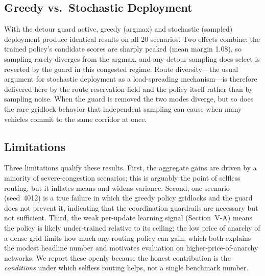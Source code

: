 \subsection{Greedy vs.\ Stochastic Deployment}
With the detour guard active, greedy (argmax) and stochastic (sampled) deployment produce
identical results on all 20 scenarios. Two effects combine: the trained policy's candidate
scores are sharply peaked (mean margin 1.08), so sampling rarely diverges from the argmax,
and any detour sampling does select is reverted by the guard in this congested regime.
Route diversity---the usual argument for stochastic deployment as a load-spreading
mechanism---is therefore delivered here by the route reservation field and the policy
itself rather than by sampling noise. When the guard is removed the two modes diverge, but
so does the rare gridlock behavior that independent sampling can cause when many vehicles
commit to the same corridor at once.

\subsection{Limitations}
Three limitations qualify these results. First, the aggregate gains are driven by a
minority of severe-congestion scenarios; this is arguably the point of selfless routing,
but it inflates means and widens variance. Second, one scenario (seed~4012) is a true
failure in which the greedy policy gridlocks and the guard does not prevent it, indicating
that the coordination guardrails are necessary but not sufficient. Third, the weak
per-update learning signal (Section~V-A) means the policy is likely under-trained relative
to its ceiling; the low price of anarchy of a dense grid limits how much any routing policy
can gain, which both explains the modest headline number and motivates evaluation on
higher-price-of-anarchy networks. We report these openly because the honest contribution is
the \emph{conditions} under which selfless routing helps, not a single benchmark number.
